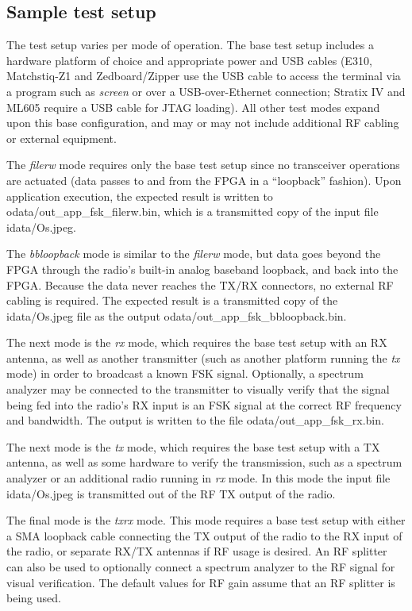 \subsection{Sample test setup}
The test setup varies per mode of operation. The base test setup includes a hardware platform of choice and appropriate power and USB cables (E310, Matchstiq-Z1 and Zedboard/Zipper use the USB cable to access the terminal via a program such as \textit{screen} or over a USB-over-Ethernet connection; Stratix IV and ML605 require a USB cable for JTAG loading). All other test modes expand upon this base configuration, and may or may not include additional RF cabling or external equipment.\par\medskip
\noindent The \textit{filerw} mode requires only the base test setup since no transceiver operations are actuated (data passes to and from the FPGA in a ``loopback'' fashion). Upon application execution, the expected result is written to odata/out\_app\_fsk\_filerw.bin, which is a transmitted copy of the input file idata/Os.jpeg.\par\medskip
\noindent The \textit{bbloopback} mode is similar to the \textit{filerw} mode, but data goes beyond the FPGA through the radio's built-in analog baseband loopback, and back into the FPGA. Because the data never reaches the TX/RX connectors, no external RF cabling is required. The expected result is a transmitted copy of the idata/Os.jpeg file as the output odata/out\_app\_fsk\_bbloopback.bin.\par\medskip
\noindent The next mode is the \textit{rx} mode, which requires the base test setup with an RX antenna, as well as another transmitter (such as another platform running the \textit{tx} mode) in order to broadcast a known FSK signal. Optionally, a spectrum analyzer may be connected to the transmitter to visually verify that the signal being fed into the radio's RX input is an FSK signal at the correct RF frequency and bandwidth. The output is written to the file odata/out\_app\_fsk\_rx.bin.\par\medskip
\noindent The next mode is the \textit{tx} mode, which requires the base test setup with a TX antenna, as well as some hardware to verify the transmission, such as a spectrum analyzer or an additional radio running in \textit{rx} mode. In this mode the input file idata/Os.jpeg is transmitted out of the RF TX output of the radio.\par\medskip
\noindent The final mode is the \textit{txrx} mode. This mode requires a base test setup with either a SMA loopback cable connecting the TX output of the radio to the RX input of the radio, or separate RX/TX antennas if RF usage is desired. An RF splitter can also be used to optionally connect a spectrum analyzer to the RF signal for visual verification. The default values for RF gain assume that an RF splitter is being used.\par\medskip
